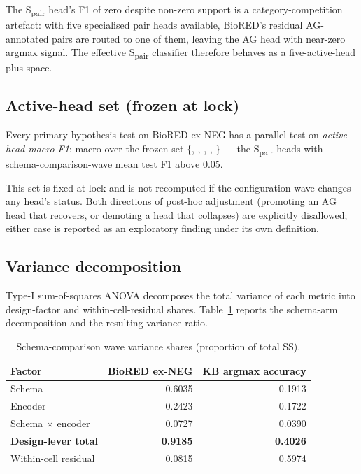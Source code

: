The S\textsubscript{pair}  head's F1 of
zero despite non-zero support is a category-competition artefact: with
five specialised pair heads available, BioRED's residual AG-annotated
pairs are routed to one of them, leaving the AG head with near-zero
argmax signal. The effective S\textsubscript{pair} classifier therefore
behaves as a five-active-head plus  space.

\subsection{Active-head set (frozen at lock)}

Every primary hypothesis test on BioRED ex-NEG has a parallel test
on \emph{active-head macro-F1}: macro over the frozen set
$\{$, , ,
, $\}$ ---
the S\textsubscript{pair} heads with schema-comparison-wave mean
test F1 above 0.05.

This set is fixed at lock and is not recomputed if the configuration
wave changes any head's status. Both directions of post-hoc adjustment
(promoting an AG head that recovers, or demoting a head that collapses)
are explicitly disallowed; either case is reported as an exploratory
finding under its own definition.

\subsection{Variance decomposition}
\label{supp:wave-a-vardecomp}

Type-I sum-of-squares ANOVA decomposes the total variance of each
metric into design-factor and within-cell-residual shares.
Table~\ref{tab:s5-vardecomp} reports the schema-arm decomposition
and the resulting variance ratio.

\begin{table}[H]
\centering
\caption{Schema-comparison wave variance shares (proportion of total
SS).}
\label{tab:s5-vardecomp}
\small
\begin{tabular}{@{}lrr@{}}
\toprule
\textbf{Factor} & \textbf{BioRED ex-NEG} & \textbf{KB argmax accuracy} \\
\midrule
Schema                            & 0.6035 & 0.1913 \\
Encoder                           & 0.2423 & 0.1722 \\
Schema $\times$ encoder           & 0.0727 & 0.0390 \\
\midrule
\textbf{Design-lever total}       & \textbf{0.9185} & \textbf{0.4026} \\
Within-cell residual              & 0.0815 & 0.5974 \\
\bottomrule
\end{tabular}
\end{table}


